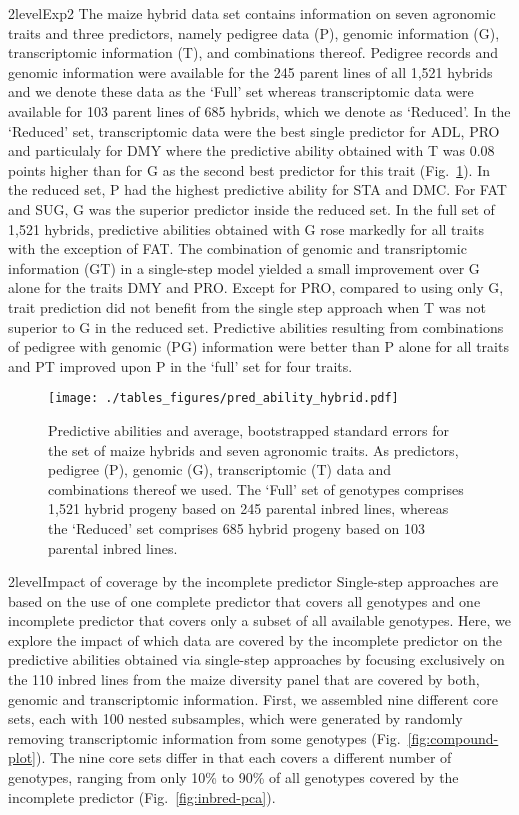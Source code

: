 \documentclass[12pt,titlepage]{article}
\begin{document}
\Genetics2level{Exp2}
The maize hybrid data set contains information on seven agronomic traits and
three predictors, namely pedigree data (P), genomic information (G), 
transcriptomic information (T), and combinations thereof.
Pedigree records and genomic information were available for the 245 parent 
lines of all 1,521 hybrids and we denote these data as the `Full' set whereas
transcriptomic data were available for 103 parent lines of 685 hybrids, which
we denote as `Reduced'.
In the `Reduced' set, transcriptomic data were the best single predictor for
ADL, PRO and particulaly for DMY where the predictive ability obtained with T
was 0.08 points higher than for G as the second best predictor for this trait
(Fig.~\ref{fig:HybridResults}).
In the reduced set, P had the highest predictive ability for STA and DMC\@.
For FAT and SUG, G was the superior predictor inside the reduced set.
In the full set of 1,521 hybrids, predictive abilities obtained with G rose 
markedly for all traits with the exception of FAT\@.
The combination of genomic and transriptomic information (GT) in a single-step
model yielded a small improvement over G alone for the traits DMY and PRO\@.
Except for PRO, compared to using only G, trait prediction did not benefit from 
the single step approach when T was not superior to G in the reduced set.
Predictive abilities resulting from combinations of pedigree with genomic (PG)
information were better than P alone for all traits and PT improved upon P in
the `full' set for four traits.

\begin{figure}[H]
\centering
  \texttt{[image: ./tables\_figures/pred\_ability\_hybrid.pdf]}
  \caption{
    Predictive abilities and average, bootstrapped standard errors for the set
    of maize hybrids and seven agronomic traits.
    As predictors, pedigree (P), genomic (G), transcriptomic (T) data and 
    combinations thereof we used.
    The `Full' set of genotypes comprises 1,521 hybrid progeny based on 245
    parental inbred lines, whereas the `Reduced' set comprises 685 hybrid
    progeny based on 103 parental inbred lines.
  }
\label{fig:HybridResults}
\end{figure}





\Genetics2level{Impact of coverage by the incomplete predictor}
Single-step approaches are based on the use of one complete predictor that
covers all genotypes and one incomplete predictor that covers only a subset of
all available genotypes.
Here, we explore the impact of which data are covered by the incomplete 
predictor on the predictive abilities obtained via single-step approaches by
focusing exclusively on the 110 inbred lines from the maize diversity panel
that are covered by both, genomic and transcriptomic information.
First, we assembled nine different core sets, each with 100 nested subsamples,
which were generated by randomly removing transcriptomic information from
some genotypes (Fig.~\ref{fig:compound-plot}).
The nine core sets differ in that each covers a different number of genotypes,
ranging from only 10\% to 90\% of all genotypes covered by the incomplete
predictor (Fig.~\ref{fig:inbred-pca}).
\end{document}
